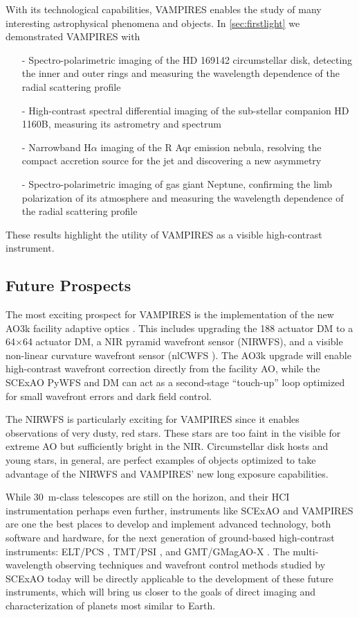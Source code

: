 With its technological capabilities, VAMPIRES enables the study of many interesting astrophysical phenomena and objects. In \autoref{sec:firstlight} we demonstrated VAMPIRES with 
\begin{itemize}
\item[-] Spectro-polarimetric imaging of the HD 169142 circumstellar disk, detecting the inner and outer rings and measuring the wavelength dependence of the radial scattering profile
\item[-] High-contrast spectral differential imaging of the sub-stellar companion HD 1160B, measuring its astrometry and spectrum
\item[-] Narrowband H$\alpha$ imaging of the R Aqr emission nebula, resolving the compact accretion source for the jet and discovering a new asymmetry
\item[-] Spectro-polarimetric imaging of gas giant Neptune, confirming the limb polarization of its atmosphere and measuring the wavelength dependence of the radial scattering profile
\end{itemize}
These results highlight the utility of VAMPIRES as a visible high-contrast instrument.

\subsection{Future Prospects}

The most exciting prospect for VAMPIRES is the implementation of the new AO3k facility adaptive optics \citep{lozi_ao3000_2022}. This includes upgrading the 188 actuator DM to a 64$\times$64 actuator DM, a NIR pyramid wavefront sensor (NIRWFS), and a visible non-linear curvature wavefront sensor (nlCWFS \citealp{ahn_development_2023}). The AO3k upgrade will enable high-contrast wavefront correction directly from the facility AO,  while the SCExAO PyWFS and DM can act as a second-stage ``touch-up'' loop optimized for small wavefront errors and dark field control.

The NIRWFS is particularly exciting for VAMPIRES since it enables observations of very dusty, red stars. These stars are too faint in the visible for extreme AO but sufficiently bright in the NIR. Circumstellar disk hosts and young stars, in general, are perfect examples of objects optimized to take advantage of the NIRWFS and VAMPIRES' new long exposure capabilities.

While \SI{30}{\meter}-class telescopes are still on the horizon, and their HCI instrumentation perhaps even further, instruments like SCExAO and VAMPIRES are one the best places to develop and implement advanced technology, both software and hardware, for the next generation of ground-based high-contrast instruments: ELT/PCS \citep{kasper_pcs_2021}, TMT/PSI \citep{fitzgerald_planetary_2019}, and GMT/GMagAO-X \citep{kautz_gmagao-x_2023}. The multi-wavelength observing techniques and wavefront control methods studied by SCExAO today will be directly applicable to the development of these future instruments, which will bring us closer to the goals of direct imaging and characterization of planets most similar to Earth.